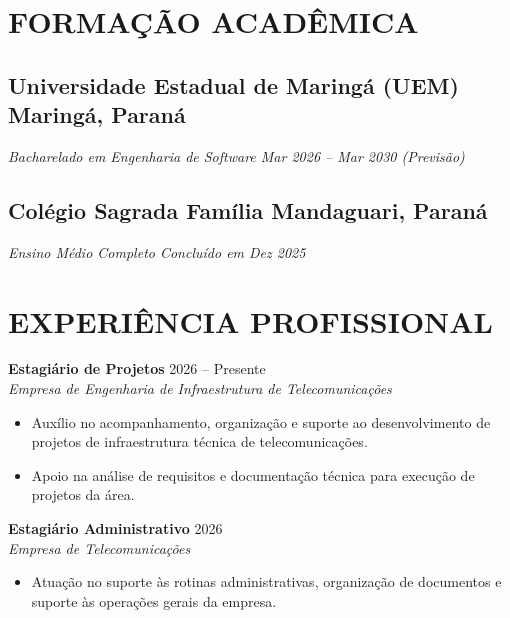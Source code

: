 \documentclass[a4paper,10pt]{article}
\begin{document}
\section{FORMAÇÃO ACADÊMICA}
    \subsection*{\texorpdfstring{
            \textbf{Universidade Estadual de Maringá (UEM)} \hfill Maringá, Paraná
        }{
            Universidade Estadual de Maringá
        }}
    \textit{Bacharelado em Engenharia de Software \hfill Mar 2026 -- Mar 2030 (Previsão)}
    
    \subsection*{\texorpdfstring{
            \textbf{Colégio Sagrada Família} \hfill Mandaguari, Paraná
        }{
            Colégio Sagrada Família
        }}
    \textit{Ensino Médio Completo \hfill Concluído em Dez 2025}

\section{EXPERIÊNCIA PROFISSIONAL}

\textbf{Estagiário de Projetos} \hfill 2026 -- Presente \\
\textit{Empresa de Engenharia de Infraestrutura de Telecomunicações}
\begin{itemize}
    \item Auxílio no acompanhamento, organização e suporte ao desenvolvimento de projetos de infraestrutura técnica de telecomunicações.
    \item Apoio na análise de requisitos e documentação técnica para execução de projetos da área.
\end{itemize}

\textbf{Estagiário Administrativo} \hfill 2026 \\
\textit{Empresa de Telecomunicações}
\begin{itemize}
    \item Atuação no suporte às rotinas administrativas, organização de documentos e suporte às operações gerais da empresa.
\end{itemize}

\end{document}
